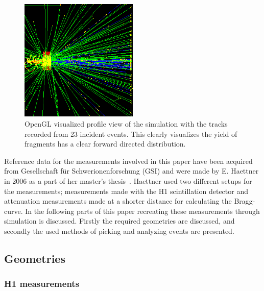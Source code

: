 \begin{figure}[h] 
\begin{center}
\includegraphics[width=0.5\textwidth]{images/twentyEvents.png}  
\caption{\label{fig:twentyEvents} OpenGL visualized profile view of the simulation with the tracks recorded from 23 incident events. This clearly visualizes the yield of fragments has a clear forward directed distribution.}
\end{center}
\end{figure}

Reference data for the measurements involved in this paper have been acquired from Gesellschaft für Schwerionenforschung (GSI) and were made by E. Haettner in 2006 as a part of her master's thesis~\cite{ehaettner}. Haettner used two different setups for the measurements; measurements made with the H1 scintillation detector and attenuation measurements made at a shorter distance for calculating the Bragg-curve. In the following parts of this paper recreating these measurements through simulation is discussed. Firstly the required geometries are discussed, and secondly the used methods of picking and analyzing events are presented.

\subsection{Geometries}

\subsubsection{H1 measurements}

